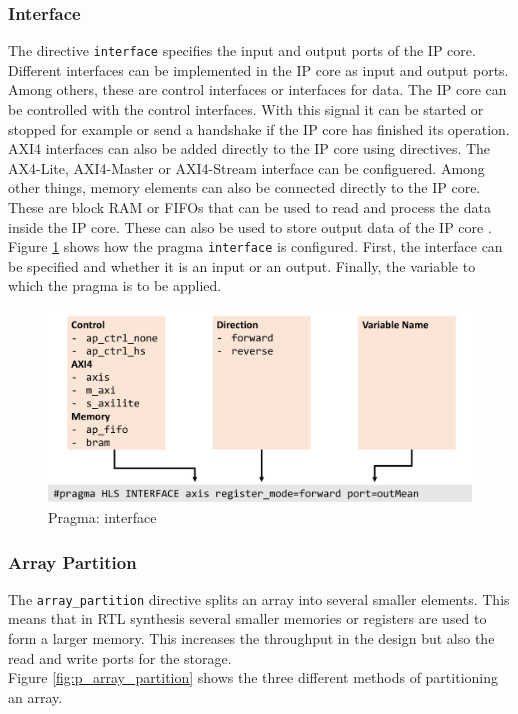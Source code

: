 \subsubsection*{Interface}
The directive \texttt{interface} specifies the input and output ports of the IP core. Different interfaces can be implemented in the IP core as input and output ports. Among others, these are control interfaces or interfaces for data. 
The IP core can be controlled with the control interfaces. With this signal it
can be started or stopped for example or send a handshake if the IP core has
finished its operation. 
AXI4 interfaces can also be added directly to the IP core using directives. The
AX4-Lite, AXI4-Master or AXI4-Stream interface can be configuered.
Among other things, memory elements can also be connected directly to the IP
core. These are block RAM or FIFOs that can be used to read and process the data
inside the IP core. These can also be used to store output data of the IP core 
\cite{pragma}. \\
Figure \ref{fig:p_interface} shows how the pragma \texttt{interface} is configured. First, the interface can be specified and whether it is an input or an output. Finally, the variable to which the pragma is to be applied.

\begin{figure}[tb!]
    \centering
    \includegraphics[width=\textwidth]{images/theory/interface.png}
    \caption{Pragma: interface}
    \label{fig:p_interface}
\end{figure}

\subsubsection*{Array Partition}
The \texttt{array\_partition} directive splits an array into several smaller
elements. This means that in RTL synthesis several smaller memories or registers
are used to form a larger memory. This increases the throughput in the
design but also the read and write ports for the storage. \\
Figure \ref{fig:p_array_partition} shows the three different methods of partitioning an array.

